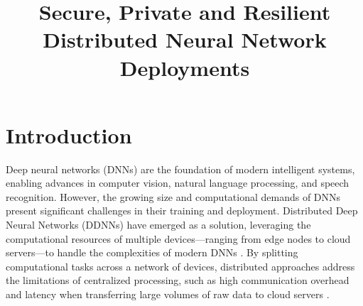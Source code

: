 \documentclass[conference]{IEEEtran}
\begin{document}
\title{Secure, Private and Resilient Distributed Neural Network Deployments}

\author{
}

\maketitle

\begin{abstract}
\end{abstract}


\section{Introduction}

Deep neural networks (DNNs) are the foundation of modern intelligent systems, enabling advances in computer vision, natural language processing, and speech recognition. However, the growing size and computational demands of DNNs present significant challenges in their training and deployment. Distributed Deep Neural Networks (DDNNs) have emerged as a solution, leveraging the computational resources of multiple devices—ranging from edge nodes to cloud servers—to handle the complexities of modern DNNs \cite{ashouri2020analyzing, abdi2023efficient}. By splitting computational tasks across a network of devices, distributed approaches address the limitations of centralized processing, such as high communication overhead and latency when transferring large volumes of raw data to cloud servers \cite{chinchali2018neural, yang2021cooperative}.
\end{document}

